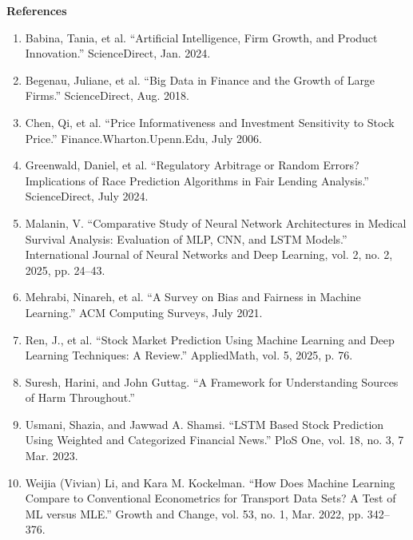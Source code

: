 \documentclass[letterpaper,12pt, twocolumn]{report}
\begin{document}
\clearpage
\large
\noindent
\textbf{References} 
\normalsize
\raggedright
\begin{enumerate}
    \item Babina, Tania, et al. “Artificial Intelligence, Firm Growth, and Product Innovation.” ScienceDirect, Jan. 2024.
    \item Begenau, Juliane, et al. “Big Data in Finance and the Growth of Large Firms.” ScienceDirect, Aug. 2018.
    \item Chen, Qi, et al. “Price Informativeness and Investment Sensitivity to Stock Price.” Finance.Wharton.Upenn.Edu, July 2006.
    \item Greenwald, Daniel, et al. “Regulatory Arbitrage or Random Errors? Implications of Race Prediction Algorithms in Fair Lending Analysis.” ScienceDirect, July 2024.
    \item Malanin, V. “Comparative Study of Neural Network Architectures in Medical Survival Analysis: Evaluation of MLP, CNN, and LSTM Models.” International Journal of Neural Networks and Deep Learning, vol. 2, no. 2, 2025, pp. 24–43.
    \item Mehrabi, Ninareh, et al. “A Survey on Bias and Fairness in Machine Learning.” ACM Computing Surveys, July 2021.
    \item Ren, J., et al. “Stock Market Prediction Using Machine Learning and Deep Learning Techniques: A Review.” AppliedMath, vol. 5, 2025, p. 76. 
    \item Suresh, Harini, and John Guttag. “A Framework for Understanding Sources of Harm Throughout.”
    \item  Usmani, Shazia, and Jawwad A. Shamsi. “LSTM Based Stock Prediction Using Weighted and Categorized Financial News.” PloS One, vol. 18, no. 3, 7 Mar. 2023.
    \item Weijia (Vivian) Li, and Kara M. Kockelman. “How Does Machine Learning Compare to Conventional Econometrics for Transport Data Sets? A Test of ML versus MLE.” Growth and Change, vol. 53, no. 1, Mar. 2022, pp. 342–376.

\end{enumerate} 
\end{document}
